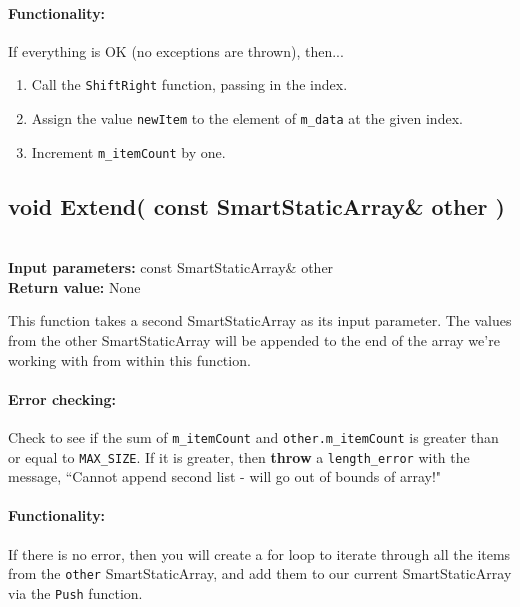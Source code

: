 \documentclass[a4paper,12pt]{book}
\begin{document}
    \paragraph{Functionality:}
    If everything is OK (no exceptions are thrown), then...

    \begin{enumerate}
        \item Call the \texttt{ShiftRight} function, passing in the index.
        \item Assign the value \texttt{newItem} to the element of \texttt{m\_data}
            at the given index.
        \item Increment \texttt{m\_itemCount} by one.
    \end{enumerate}


    
    \hrulefill
    \subsection*{void Extend( const SmartStaticArray\& other )}

    \begin{framed} ~\\
        \textbf{Input parameters:} const SmartStaticArray\& other \\
        \textbf{Return value:} None
    \end{framed}

    This function takes a second SmartStaticArray as its input parameter.
    The values from the other SmartStaticArray will be appended to the
    end of the array we're working with from within this function.
    
    \paragraph{Error checking:}
    Check to see if the sum of \texttt{m\_itemCount} and
    \texttt{other.m\_itemCount} is greater than or equal to \texttt{MAX\_SIZE}.
    If it is greater, then \textbf{throw} a \texttt{length\_error} with
    the message, ``Cannot append second list - will go out of bounds of array!"

    \paragraph{Functionality:}
    If there is no error, then you will create a for loop to iterate
    through all the items from the \texttt{other} SmartStaticArray,
    and add them to our current SmartStaticArray via the \texttt{Push} function.
\end{document}
